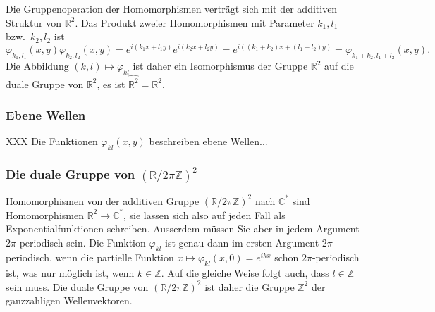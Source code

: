Die Gruppenoperation der Homomorphismen verträgt sich mit der additiven
Struktur von $\mathbb{R}^2$.
Das Produkt zweier Homomorphismen mit Parameter $k_1,l_1$ bzw.~$k_2,l_2$
ist
\[
\varphi_{k_1,l_1}(x,y)
\varphi_{k_2,l_2}(x,y)
=
e^{i(k_1x+l_1y)}
e^{i(k_2x+l_2y)}
=
e^{i((k_1+k_2)x+(l_1+l_2)y)}
=
\varphi_{k_1+k_2,l_1+l_2}(x,y).
\]
Die Abbildung $(k,l)\mapsto \varphi_{kl}$ ist daher ein Isomorphismus
der Gruppe $\mathbb{R}^2$ auf die duale Gruppe von $\mathbb{R}^2$,
es ist $\widehat{\mathbb{R}^2} = \mathbb{R}^2$.

%
%
\subsubsection{Ebene Wellen}
XXX Die Funktionen $\varphi_{kl}(x,y)$ beschreiben ebene Wellen...

%
%
\subsubsection{Die duale Gruppe von $(\mathbb{R}/2\pi\mathbb{Z})^2$}
Homomorphismen von der additiven Gruppe $(\mathbb{R}/2\pi\mathbb{Z})^2$
nach $\mathbb{C}^*$ sind Homomorphismen $\mathbb{R}^2\to\mathbb{C}^*$,
sie lassen sich also auf jeden Fall als Exponentialfunktionen schreiben.
Ausserdem müssen Sie aber in jedem Argument $2\pi$-periodisch sein.
Die Funktion $\varphi_{kl}$ ist genau dann im ersten Argument
$2\pi$-periodisch, wenn die partielle Funktion
$x\mapsto \varphi_{kl}(x,0) = e^{ikx}$ schon $2\pi$-periodisch ist,
was nur möglich ist, wenn $k\in\mathbb{Z}$.
Auf die gleiche Weise folgt auch, dass $l\in\mathbb{Z}$ sein muss.
Die duale Gruppe von $(\mathbb{R}/2\pi\mathbb{Z})^2$ ist daher
die Gruppe $\mathbb{Z}^2$ der ganzzahligen Wellenvektoren.

%
%
